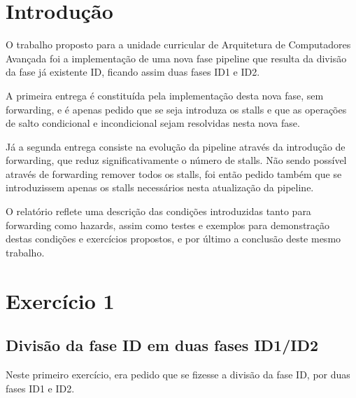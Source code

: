 \documentclass[pdftex,12pt,a4paper]{report}
\begin{document}
\renewcommand{\headrulewidth}{0pt}

\fancyhead{}
\fancyfoot{}
\rfoot{\thepage}

\renewcommand*\contentsname{Conteúdos}
\renewcommand*\figurename{Figura}
\renewcommand*\tablename{Tabela}

\tableofcontents
\renewcommand{\headrulewidth}{0.15pt}
\renewcommand{\thechapter}{}

\clearpage

\section{Introdução}

O trabalho proposto para a unidade curricular de Arquitetura de Computadores Avançada foi a implementação de uma nova fase pipeline que resulta da divisão da fase já existente ID, ficando assim duas fases ID1 e ID2.

A primeira entrega é constituída pela implementação desta nova fase, sem forwarding, e é apenas pedido que se seja introduza os stalls e que as operações de salto condicional e incondicional sejam resolvidas nesta nova fase.

Já a segunda entrega consiste na evolução da pipeline através da introdução de forwarding, que reduz significativamente o número de stalls. Não sendo possível através de forwarding remover todos os stalls, foi então pedido também que se introduzissem apenas os stalls necessários nesta atualização da pipeline.

O relatório reflete uma descrição das condições introduzidas tanto para forwarding como hazards, assim como testes e exemplos para demonstração destas condições e exercícios propostos, e por último a conclusão deste mesmo trabalho.

\newpage
\section{Exercício 1}

\subsection{Divisão da fase ID em duas fases ID1/ID2}
Neste primeiro exercício, era pedido que se fizesse a divisão da fase ID, por duas fases ID1 e ID2.
\end{document}
